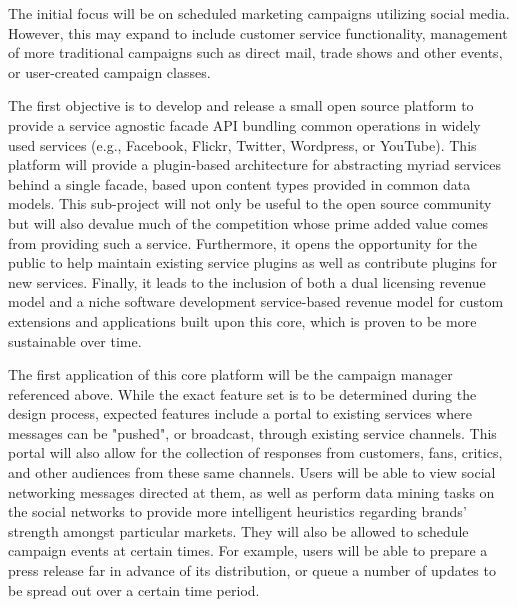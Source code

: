 \documentclass{article}
\begin{document}
The initial focus will be on scheduled marketing campaigns utilizing
social media. However, this may expand to include customer service
functionality, management of more traditional campaigns such as
direct mail, trade shows and other events, or user-created campaign
classes.
 
The first objective is to develop and release a small open source
platform to provide a service agnostic facade API bundling common
operations in widely used services (e.g., Facebook, Flickr, Twitter,
Wordpress, or YouTube). This platform will provide a plugin-based
architecture for abstracting myriad services behind a single facade,
based upon content types provided in common data models. This
sub-project will not only be useful to the open source community but
will also devalue much of the competition whose prime added value
comes from providing such a service. Furthermore, it opens the
opportunity for the public to help maintain existing service plugins
as well as contribute plugins for new services. Finally, it leads to
the inclusion of both a dual licensing revenue model and a niche
software development service-based revenue model for custom extensions
and applications built upon this core, which is proven to be more
sustainable over time.
 
The first application of this core platform will be the campaign
manager referenced above.  While the exact feature set is to be
determined during the design process, expected features include a
portal to existing services where messages can be "pushed", or
broadcast, through existing service channels. This portal will also
allow for the collection of responses from customers, fans, critics,
and other audiences from these same channels. Users will be able to
view social networking messages directed at them, as well as perform
data mining tasks on the social networks to provide more intelligent
heuristics regarding brands' strength amongst particular markets. They
will also be allowed to schedule campaign events at certain times. For
example, users will be able to prepare a press release far in advance
of its distribution, or queue a number of updates to be spread out
over a certain time period.
\end{document}
